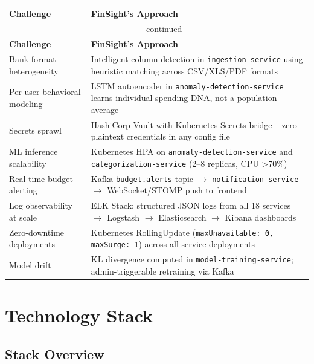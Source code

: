 \documentclass[12pt,a4paper]{report}
\begin{document}
\begin{longtable}{p{3.5cm} p{10.5cm}}
\toprule
\textbf{Challenge} & \textbf{FinSight's Approach} \\
\midrule
\endfirsthead
\multicolumn{2}{c}{\tablename\ \thetable{} -- continued}\\
\toprule
\textbf{Challenge} & \textbf{FinSight's Approach} \\
\midrule
\endhead
\bottomrule
\endlastfoot

Bank format heterogeneity & Intelligent column detection in \texttt{ingestion-service} using heuristic matching across CSV/XLS/PDF formats \\[4pt]
Per-user behavioral modeling & LSTM autoencoder in \texttt{anomaly-detection-service} learns individual spending DNA, not a population average \\[4pt]
Secrets sprawl & HashiCorp Vault with Kubernetes Secrets bridge -- zero plaintext credentials in any config file \\[4pt]
ML inference scalability & Kubernetes HPA on \texttt{anomaly-detection-service} and \texttt{categorization-service} (2--8 replicas, CPU \textgreater 70\%) \\[4pt]
Real-time budget alerting & Kafka \texttt{budget.alerts} topic $\rightarrow$ \texttt{notification-service} $\rightarrow$ WebSocket/STOMP push to frontend \\[4pt]
Log observability at scale & ELK Stack: structured JSON logs from all 18 services $\rightarrow$ Logstash $\rightarrow$ Elasticsearch $\rightarrow$ Kibana dashboards \\[4pt]
Zero-downtime deployments & Kubernetes RollingUpdate (\texttt{maxUnavailable: 0, maxSurge: 1}) across all service deployments \\[4pt]
Model drift & KL divergence computed in \texttt{model-training-service}; admin-triggerable retraining via Kafka \\[4pt]
\end{longtable}

\chapter{Technology Stack}

\section{Stack Overview}
\end{document}
